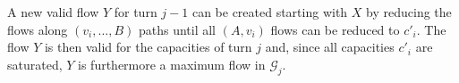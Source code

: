\begin{proofsketch}
  A new valid flow $Y$ for turn $j - 1$ can be created starting with $X$ by reducing the flows along $\left(v_i, ...,
  B\right)$ paths until all $\left(A, v_i\right)$ flows can be reduced to $c'_i$. The flow $Y$ is then valid for the
  capacities of turn $j$ and, since all capacities $c'_i$ are saturated, $Y$ is furthermore a maximum flow in $\mathcal{G}_j$.
\end{proofsketch}
